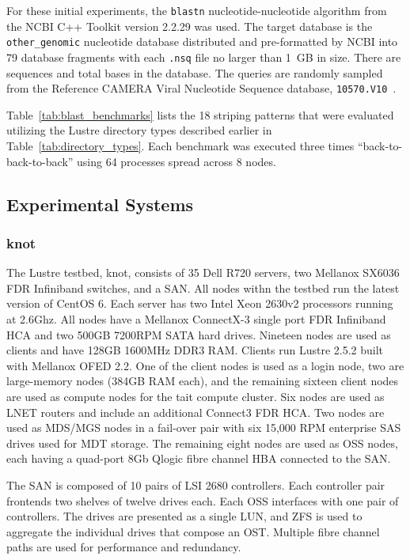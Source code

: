\documentclass[conference,compsoc]{IEEEtran}
\begin{document}
For these initial experiments, the \texttt{blastn} nucleotide-nucleotide algorithm from the NCBI C++ Toolkit version 2.2.29 was used. 
The target database is the \texttt{other\_genomic} nucleotide database distributed and pre-formatted by NCBI into 79 database fragments with each \texttt{.nsq} file no larger than 1~GB in size\cite{other_genomic}. There are  sequences and  total bases in the database. The queries are randomly sampled from the Reference CAMERA Viral Nucleotide Sequence database, \texttt{10570.V10}~\cite{10570}.





Table~\ref{tab:blast_benchmarks} lists the 18 striping patterns that were evaluated utilizing the Lustre directory types described earlier in Table~\ref{tab:directory_types}. Each benchmark was executed three times ``back-to-back-to-back'' using 64 processes spread across 8 nodes.



\subsection{Experimental Systems}

\subsubsection{knot}

The Lustre testbed, knot, consists of 35 Dell R720 servers, two Mellanox SX6036 FDR Infiniband switches, and a SAN. 
All nodes withn the testbed run the latest version of CentOS 6. 
Each server has two Intel Xeon 2630v2 processors running at 2.6Ghz.
All nodes have a Mellanox ConnectX-3 single port FDR Infiniband HCA and two 500GB 7200RPM SATA hard drives. 
Nineteen nodes are used as clients and have 128GB 1600MHz DDR3 RAM. 
Clients run Lustre 2.5.2 built with Mellanox OFED 2.2.
One of the client nodes is used as a login node, two are large-memory nodes (384GB RAM each), and 
the remaining sixteen client nodes are used as compute nodes for the tait compute cluster.
Six nodes are used as LNET routers and include an additional Connect3 FDR HCA. 
Two nodes are used as MDS/MGS nodes in a fail-over pair with six 15,000 RPM enterprise SAS drives used for MDT storage. 
The remaining eight nodes are used as OSS nodes, each having a quad-port 8Gb Qlogic fibre channel HBA connected to the SAN.

The SAN is composed of 10 pairs of LSI 2680 controllers. 
Each controller pair frontends two shelves of twelve drives each. 
Each OSS interfaces with one pair of controllers. 
The drives are presented as a single LUN, and ZFS is used to aggregate the individual drives that compose an OST. 
Multiple fibre channel paths are used for performance and redundancy.
\end{document}
